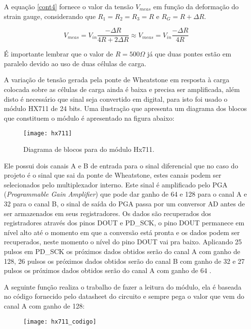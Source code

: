 A equação \ref{cont4} fornece o valor da tensão $V_{meas}$ em função da deformação do strain gauge, considerando que $R_{1}=R_{2}=R_{3}=R$ e $R_{G}=R+\Delta R$.

\begin{equation}
\label{cont4}
V_{meas}=V_{in} \frac{-\Delta R}{4R+2\Delta R} \approx V_{meas}=V_{in} \frac{-\Delta R}{4R}
\end{equation}

É importante lembrar que o valor de $R=500\Omega$ já que duas pontes estão em paralelo devido ao uso de duas células de carga.

A variação de tensão gerada pela ponte de Wheatstone em resposta à carga colocada sobre as células de carga ainda é baixa e precisa ser amplificada, além disto é necessário que  sinal seja convertido em digital, para isto foi usado o módulo HX711 de 24 bits. Uma ilustração que apresenta um diagrama dos blocos que constituem o módulo é apresentado na figura abaixo:

\begin{figure}[!h]
\centering \texttt{[image: hx711]}
\caption{Diagrama de blocos para do módulo Hx711.}
\label{hx711}
 \end{figure}

Ele possui dois canais A e B de entrada para o sinal diferencial que no caso do projeto é o sinal que sai da ponte de Wheatstone, estes canais podem ser selecionados pelo multiplexador interno. Este sinal é amplificado pelo PGA (\textit{Programmable Gain Amplifier}) que pode dar ganho de 64 e 128 para o canal A e 32 para o canal B, o sinal de saída do PGA passa por um conversor AD antes de ser armazenados em seus registradores. Os dados são recuperados dos registradores através dos pinos DOUT e PD\_SCK, o pino DOUT permanece em nível alto até o momento em que a conversão está pronta e os dados podem ser recuperados, neste momento o nível do pino DOUT vai pra baixo. Aplicando 25 pulsos em PD\_SCK os próximos dados obtidos serão do canal A com ganho de 128, 26 pulsos os próximos dados obtidos serão do canal B com ganho de 32 e 27 pulsos os próximos dados obtidos serão do canal A com ganho de 64 \cite{avia:hx711}.

A seguinte função realiza o trabalho de fazer a leitura do módulo, ela é baseada no código fornecido pelo datasheet do circuito e sempre pega o valor que vem do canal A com ganho de 128:

\begin{figure}[!h]
\centering \texttt{[image: hx711\_codigo]}

\label{hx711codigo}
 \end{figure}

